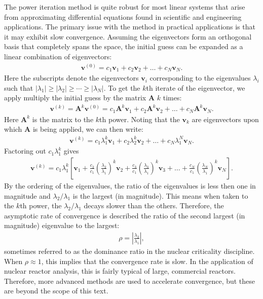 The power iteration method is quite robust for most linear systems that arise from approximating differential equations found in scientific and engineering applications. The primary issue with the method in practical applications is that it may exhibit slow convergence. Assuming the eigenvectors form an orthogonal basis that completely spans the space, the initial guess can be expanded as a linear combination of eigenvectors:
\begin{align}
  \mathbf{v}^{(0)} = c_1 \mathbf{v}_1 + c_2 \mathbf{v}_2 + \ldots + c_N \mathbf{v}_N .
\end{align}
Here the subscripts denote the eigenvectors $\mathbf{v}_i$ corresponding to the eigenvalues $\lambda_i$ such that $| \lambda_1 | \ge | \lambda_2 | \ge \cdots \ge | \lambda_N |$. To get the $k$th iterate of the eigenvector, we apply multiply the initial guess by the matrix $\mathbf{A}$ $k$ times:
\begin{align}
  \mathbf{v}^{(k)} = \mathbf{A}^k \mathbf{v}^{(0)} = c_1 \mathbf{A}^k \mathbf{v}_1 + c_2 \mathbf{A}^k \mathbf{v}_2 + \ldots + c_N \mathbf{A}^k \mathbf{v}_N .
\end{align}
Here $\mathbf{A}^k$ is the matrix to the $k$th power. Noting that the $\mathbf{v}_k$ are eigenvectors upon which $\mathbf{A}$ is being applied, we can then write:
\begin{align}
  \mathbf{v}^{(k)} = c_1 \lambda_1^k \mathbf{v}_1 + c_2 \lambda_2^k \mathbf{v}_2 + \ldots + c_N \lambda_1^N \mathbf{v}_N .
\end{align}
Factoring out $c_1 \lambda_1^k$ gives
\begin{align}
  \mathbf{v}^{(k)} = c_1 \lambda_1^k \left[ \mathbf{v}_1 + \frac{c_2}{c_1} \left( \frac{\lambda_2}{\lambda_1} \right)^k \mathbf{v}_2 + \frac{c_3}{c_1} \left( \frac{\lambda_3}{\lambda_1} \right)^k \mathbf{v}_3 + \ldots + \frac{c_N}{c_1} \left( \frac{\lambda_N}{\lambda_1} \right)^k\mathbf{v}_N \right].
\end{align}
By the ordering of the eigenvalues, the ratio of the eigenvalues is less then one in magnitude and $\lambda_2 / \lambda_1$ is the largest (in magnitude). This means when taken to the $k$th power, the $\lambda_2 / \lambda_1$ decays slower than the others. Therefore, the asymptotic rate of convergence is described the ratio of the second largest (in magnitude) eigenvalue to the largest:
\begin{align}
  \rho = \left| \frac{\lambda_2}{\lambda_1} \right| ,
\end{align}
sometimes referred to as the dominance ratio in the nuclear criticality discipline. When $\rho \approx 1$, this implies that the convergence rate is slow. In the application of nuclear reactor analysis, this is fairly typical of large, commercial reactors. Therefore, more advanced methods are used to accelerate convergence, but these are beyond the scope of this text.

